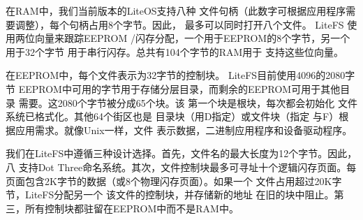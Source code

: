 在RAM中，我们当前版本的LiteOS支持八种
文件句柄（此数字可根据应用程序需要调整），每个句柄占用8个字节。因此，
最多可以同时打开八个文件。 LiteFS
使用两位向量来跟踪EEPROM /闪存分配，一个用于EEPROM的8个字节，另一个用于32个字节
用于串行闪存。总共有104个字节的RAM用于
支持这些位向量。

在EEPROM中，每个文件表示为32字节的控制块。 LiteFS目前使用4096的2080字节
EEPROM中可用的字节用于存储分层目录，而剩余的EEPROM可用于其他目录
需要。这2080个字节被分成65个块。该
第一个块是根块，每次都会初始化
文件系统已格式化。其他64个街区也是
目录块（用D指定）或文件块（指定
与F）根据应用需求。就像Unix一样，文件
表示数据，二进制应用程序和设备驱动程序。

我们在LiteFS中遵循三种设计选择。首先，文件名的最大长度为12个字节。因此，八
支持Dot Three命名系统。其次，文件控制块最多可寻址十个逻辑闪存页面。每
页面包含2K字节的数据（或8个物理闪存页面）。如果一个
文件占用超过20K字节，LiteFS分配另一个
该文件的控制块，并存储新的地址
在旧的块中阻止。第三，所有控制块都驻留在EEPROM中而不是RAM中。